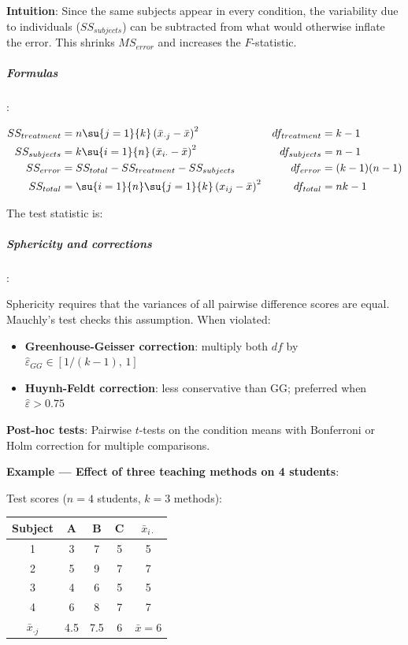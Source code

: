 \textbf{Intuition}: Since the same subjects appear in every condition, the variability due
to individuals ($SS_{subjects}$) can be subtracted from what would otherwise inflate the
error. This shrinks $MS_{error}$ and increases the $F$-statistic.

\subparagraph{Formulas}:

\begin{align*}
    SS_{treatment} &= n\su{j=1}{k}\left(\bar{x}_{\cdot j} - \bar{x}\right)^2
    & df_{treatment} &= k - 1 \\
    SS_{subjects}  &= k\su{i=1}{n}\left(\bar{x}_{i\cdot} - \bar{x}\right)^2
    & df_{subjects} &= n - 1 \\
    SS_{error}     &= SS_{total} - SS_{treatment} - SS_{subjects}
    & df_{error} &= (k-1)(n-1) \\
    SS_{total}     &= \su{i=1}{n}\su{j=1}{k}\left(x_{ij} - \bar{x}\right)^2
    & df_{total} &= nk - 1
\end{align*}

The test statistic is:
\begin{center}
\end{center}

\subparagraph{Sphericity and corrections}:

Sphericity requires that the variances of all pairwise difference scores are equal.
Mauchly's test checks this assumption. When violated:
\begin{itemize}
    \item \textbf{Greenhouse-Geisser correction}: multiply both $df$ by $\hat{\varepsilon}_{GG} \in [1/(k-1),\,1]$
    \item \textbf{Huynh-Feldt correction}: less conservative than GG; preferred when $\hat{\varepsilon} > 0.75$
\end{itemize}

\textbf{Post-hoc tests}: Pairwise $t$-tests on the condition means with Bonferroni or
Holm correction for multiple comparisons.

\textbf{Example — Effect of three teaching methods on 4 students}:

Test scores ($n=4$ students, $k=3$ methods):

\begin{center}
\begin{tabular}{|c|ccc|c|}
    \hline
    \textbf{Subject} & \textbf{A} & \textbf{B} & \textbf{C} & $\bar{x}_{i\cdot}$ \\
    \hline
    1 & 3 & 7 & 5 & 5 \\
    2 & 5 & 9 & 7 & 7 \\
    3 & 4 & 6 & 5 & 5 \\
    4 & 6 & 8 & 7 & 7 \\
    \hline
    $\bar{x}_{\cdot j}$ & 4.5 & 7.5 & 6 & $\bar{x} = 6$ \\
    \hline
\end{tabular}
\end{center}

